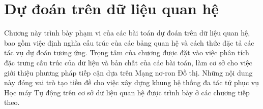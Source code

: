 \chapter{Dự đoán trên dữ liệu quan hệ}

Chương này trình bày phạm vi của các bài toán dự đoán trên dữ liệu quan hệ, bao gồm việc định nghĩa cấu trúc của các bảng quan hệ và cách thức đặc tả các tác vụ dự đoán tương ứng. Trọng tâm của chương được đặt vào việc phân tích đặc trưng cấu trúc của dữ liệu và bản chất của các bài toán, làm cơ sở cho việc giới thiệu phương pháp tiếp cận dựa trên Mạng nơ-ron Đồ thị. Những nội dung này đóng vai trò tạo tiền đề cho việc xây dựng khung hệ thống đa tác tử phục vụ Học máy Tự động trên cơ sở dữ liệu quan hệ được trình bày ở các chương tiếp theo.



